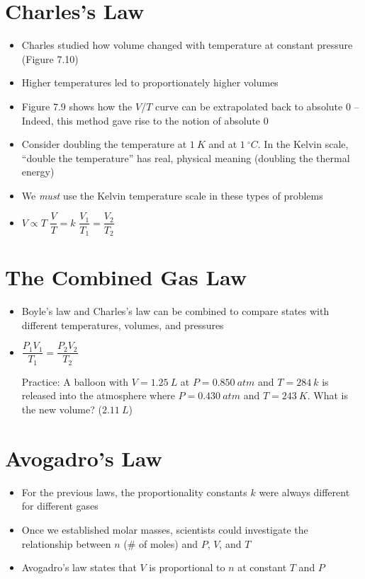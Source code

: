 \documentclass[12pt, openany, letterpaper]{memoir}
\begin{document}
\section{Charles's Law}
\begin{itemize}
	\item Charles studied how volume changed with temperature at constant pressure (Figure 7.10)
	\item Higher temperatures led to proportionately higher volumes
	\item Figure 7.9 shows how the $V$/$T$ curve can be extrapolated back to absolute $0$ -- Indeed, this method gave rise to the notion of absolute $0$
	\item Consider doubling the temperature at $1~K$ and at $1~^\circ C$. In the Kelvin scale, ``double the temperature'' has real, physical meaning (doubling the thermal energy)
	\item We \emph{must} use the Kelvin temperature scale in these types of problems
	\item $V\propto T$ \hspace{2em} $\dfrac{V}{T} = k$ \hspace{2em} $\dfrac{V_1}{T_1}=\dfrac{V_2}{T_2}$

\end{itemize}
\section{The Combined Gas Law}
\begin{itemize}
	\item Boyle's law and Charles's law can be combined to compare states with different temperatures, volumes, and pressures
	\item $\dfrac{P_1V_1}{T_1}=\dfrac{P_2V_2}{T_2}$
	
	Practice: A balloon with $V=1.25~L$ at $P=0.850~atm$ and $T=284~k$ is released into the atmosphere where $P=0.430~atm$ and $T=243~K$. What is the new volume? ($2.11~L$) 
\end{itemize}
\section{Avogadro's Law}
\begin{itemize}
	\item For the previous laws, the proportionality constants $k$ were always different for different gases
	\item Once we established molar masses, scientists could investigate the relationship between $n$ (\# of moles) and $P$, $V$, and $T$
	\item Avogadro's law states that $V$ is proportional to $n$ at constant $T$ and $P$
\end{itemize}
\end{document}
